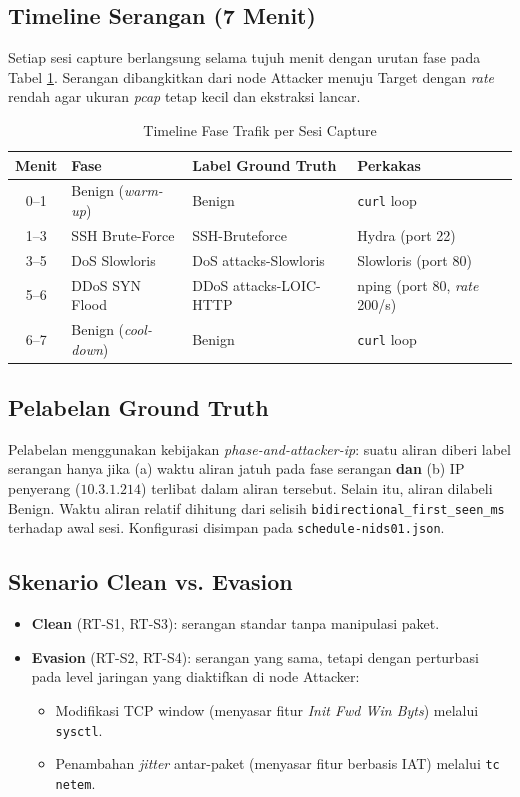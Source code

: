 \documentclass[11pt, a4paper]{article}
\begin{document}
\subsection{Timeline Serangan (7 Menit)}
Setiap sesi capture berlangsung selama tujuh menit dengan urutan fase pada Tabel \ref{tab:timeline}. Serangan dibangkitkan dari node Attacker menuju Target dengan \textit{rate} rendah agar ukuran \textit{pcap} tetap kecil dan ekstraksi lancar.

\begin{table}[htbp]
\centering
\caption{Timeline Fase Trafik per Sesi Capture}
\label{tab:timeline}
\small
\begin{tabularx}{\linewidth}{@{} c l l X @{}}
\toprule
\textbf{Menit} & \textbf{Fase} & \textbf{Label Ground Truth} & \textbf{Perkakas} \\ \midrule
0--1 & Benign (\textit{warm-up}) & Benign & \texttt{curl} loop \\
1--3 & SSH Brute-Force & SSH-Bruteforce & Hydra (port 22) \\
3--5 & DoS Slowloris & DoS attacks-Slowloris & Slowloris (port 80) \\
5--6 & DDoS SYN Flood & DDoS attacks-LOIC-HTTP & nping (port 80, \textit{rate} 200/s) \\
6--7 & Benign (\textit{cool-down}) & Benign & \texttt{curl} loop \\ \bottomrule
\end{tabularx}
\end{table}

\subsection{Pelabelan Ground Truth}
Pelabelan menggunakan kebijakan \textit{phase-and-attacker-ip}: suatu aliran diberi label serangan hanya jika (a) waktu aliran jatuh pada fase serangan \textbf{dan} (b) IP penyerang ($10.3.1.214$) terlibat dalam aliran tersebut. Selain itu, aliran dilabeli Benign. Waktu aliran relatif dihitung dari selisih \texttt{bidirectional\_first\_seen\_ms} terhadap awal sesi. Konfigurasi disimpan pada \texttt{schedule-nids01.json}.

\subsection{Skenario Clean vs. Evasion}
\begin{itemize}[leftmargin=1.4cm]
    \item \textbf{Clean} (RT-S1, RT-S3): serangan standar tanpa manipulasi paket.
    \item \textbf{Evasion} (RT-S2, RT-S4): serangan yang sama, tetapi dengan perturbasi pada level jaringan yang diaktifkan di node Attacker:
    \begin{itemize}
        \item Modifikasi TCP window (menyasar fitur \textit{Init Fwd Win Byts}) melalui \texttt{sysctl}.
        \item Penambahan \textit{jitter} antar-paket (menyasar fitur berbasis IAT) melalui \texttt{tc netem}.
    \end{itemize}
\end{itemize}
\end{document}
